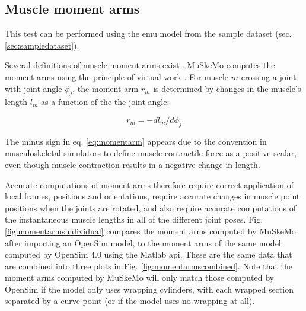 \documentclass{article}
\begin{document}
\subsection{Muscle moment arms}
\label{sec:momentarmvalidation}

This test can be performed using the emu model from the sample dataset (sec. \ref{sec:sampledataset}).

Several definitions of muscle moment arms exist \cite{anDeterminationMuscleOrientations1984}. MuSkeMo computes the moment arms using the principle of virtual work \cite{anDeterminationMuscleOrientations1984,storaceFunctionalAnalysisRole1979}. For muscle \(m\) crossing a joint with joint angle \(\phi_j\), the moment arm \(r_m\) is determined by changes in the muscle's length \(l_m\) as a function of the the joint angle:

\begin{equation}
r_m = -dl_m / d\phi_j
\end{equation}
\label{eq:momentarm}

The minus sign in eq. \ref{eq:momentarm} appears due to the convention in musculoskeletal simulators to define muscle contractile force as a positive scalar, even though muscle contraction results in a negative change in length.

Accurate computations of moment arms therefore require correct application of local frames, positions and orientations, require accurate changes in muscle point positions when the joints are rotated, and also require accurate computations of the instantaneous muscle lengths in all of the different joint poses. Fig. \ref{fig:momentarmsindividual} compares the moment arms computed by MuSkeMo after importing an OpenSim model, to the moment arms of the same model computed by OpenSim 4.0 using the Matlab api. These are the same data that are combined into three plots in Fig. \ref{fig:momentarmscombined}. Note that the moment arms computed by MuSkeMo will only match those computed by OpenSim if the model only uses wrapping cylinders, with each wrapped section separated by a curve point (or if the model uses no wrapping at all).
\end{document}
